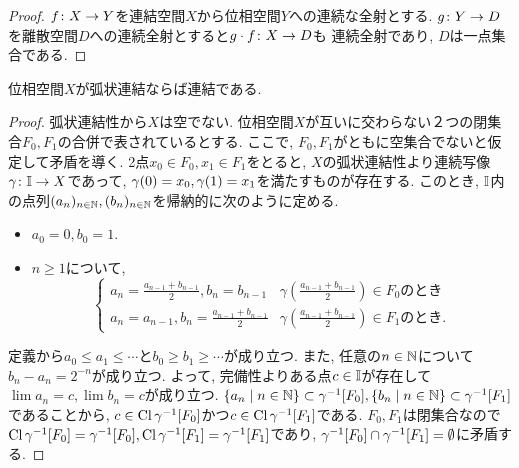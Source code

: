 \documentclass[uplatex, dvipdfmx, a4paper, 12pt, class=jsbook, crop=false]{standalone}
\begin{document}
\begin{proof}
	$ f\colon X\to Y $を連結空間$ X $から位相空間$ Y $への連続な全射とする.
	$ g\colon Y\to D $を離散空間$ D $への連続全射とすると$ g \cdot f\colon X\to D $も
	連続全射であり, $ D $は一点集合である.
\end{proof}

\begin{proposition}
	\label{prop:PathCtd>Ctd}
	位相空間$ X $が弧状連結ならば連結である.
\end{proposition}

\begin{proof}
	弧状連結性から$ X $は空でない.
	位相空間$ X $が互いに交わらない２つの閉集合$ F_0, F_1 $の合併で表されているとする.
	ここで, $ F_0, F_1 $がともに空集合でないと仮定して矛盾を導く.
	2点$ x_0 \in F_0, x_1 \in F_1 $をとると, $ X $の弧状連結性より連続写像$ \gamma\colon\mathbb{I}\to X $であって,
	$ \mappt{\gamma}{0} = x_0, \mappt{\gamma}{1} = x_1 $を満たすものが存在する.
	このとき, $ \mathbb{I} $内の点列$ (a_n)_{n\in \mathbb{N}}, (b_n)_{n \in \mathbb{N}} $を帰納的に次のように定める.
	\begin{itemize}
		\item $ a_0 = 0, b_0 = 1 $.
		\item $ n \geq 1 $について,
		\begin{equation}
			\begin{cases}
				a_n = \frac{a_{n-1} + b_{n-1}}{2}, b_n = b_{n-1} & \gamma\left(\frac{a_{n-1} + b_{n-1}}{2}\right) \in F_0 \text{のとき} \\
				a_n = a_{n-1}, b_n = \frac{a_{n-1} + b_{n-1}}{2} & \gamma\left(\frac{a_{n-1} + b_{n-1}}{2}\right) \in F_1 \text{のとき} .
			\end{cases}
		\end{equation}
	\end{itemize}
	定義から$ a_0 \leq a_1 \leq \cdots $と$ b_0 \geq b_1 \geq \cdots $が成り立つ.
	また, 任意の$ n \in \mathbb{N} $について$ b_n - a_n = 2^{-n} $が成り立つ.
	よって, 完備性よりある点$ c \in \mathbb{I} $が存在して$ \lim a_n = c, \lim b_n = c $が成り立つ.
	$ \setcomp{a_n}{n \in \N} \subset \mapinvset{\gamma}{F_0}, \setcomp{b_n}{n \in \N} \subset \mapinvset{\gamma}{F_1}$であることから,
	$ c \in \topcl{\mapinvset{\gamma}{F_0}} $かつ$ c \in \topcl{\mapinvset{\gamma}{F_1}} $である.
	$ F_0, F_1 $は閉集合なので$\topcl{\mapinvset{\gamma}{F_0}} = \mapinvset{\gamma}{F_0}, \topcl{\mapinvset{\gamma}{F_1}} = \mapinvset{\gamma}{F_1} $であり,
	$ \mapinvset{\gamma}{F_0} \cap \mapinvset{\gamma}{F_1} = \emptyset $に矛盾する.
\end{proof}
\end{document}
